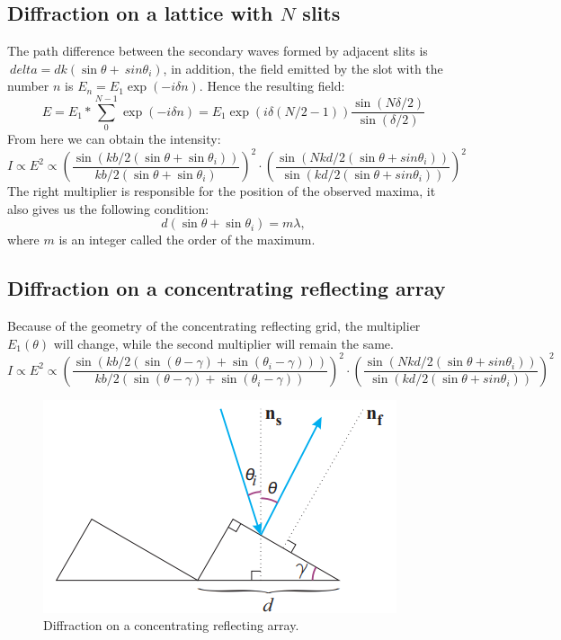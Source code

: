 \documentclass[a4paper, 12pt]{article}
\begin{document}
	\subsection*{Diffraction on a lattice with $N$ slits}
	The path difference between the secondary waves formed by adjacent slits is $ \ delta = d k (\sin{\theta} + \ sin{\theta_i})$, in addition, the field emitted by the slot with the number $n$ is $ E_n = E_1 \exp(-i \delta n)$. Hence the resulting field:
	\begin{equation}
		E = E_1 * \sum_{0}^{N-1} \exp(-i \delta n) = E_1 \exp(i\delta(N/2 - 1)) \frac{\sin(N \delta /2)}{\sin(\delta /2)}
	\end{equation}
	From here we can obtain the intensity:
	\begin{equation}
		I \propto E^2 \propto (\frac{\sin(k b / 2 (\sin{\theta} + \sin{\theta_i}))}{k b / 2 (\sin{\theta} + \sin{\theta_i})})^2 \cdot (\frac{\sin(N k d / 2 (\sin{\theta} + sin{\theta_i}))}{\sin(k d / 2 (\sin{\theta} + sin{\theta_i}))})^2
	\end{equation}
	The right multiplier is responsible for the position of the observed maxima, it also gives us the following condition:
	\begin{equation}
		d(\sin{\theta} + \sin{\theta_i}) = m \lambda,
	\end{equation}
	where $m$ is an integer called the order of the maximum.
	\subsection*{Diffraction on a concentrating reflecting array}
	Because of the geometry of the concentrating reflecting grid, the multiplier $E_1(\theta)$ will change, while the second multiplier will remain the same.
	\begin{equation}
		I \propto E^2 \propto (\frac{\sin(k b / 2 (\sin(\theta - \gamma) + \sin(\theta_i - \gamma)))}{k b / 2 (\sin(\theta - \gamma) + \sin(\theta_i - \gamma))})^2 \cdot  (\frac{\sin(N k d / 2 (\sin{\theta} + sin{\theta_i}))}{\sin(k d / 2 (\sin{\theta} + sin{\theta_i}))})^2
	\end{equation}
	
	\begin{figure}[H]
		\centering
		\includegraphics[width=0.85\linewidth]{diff2.png}
		\caption{Diffraction on a concentrating reflecting array.}
		\label{fig:2}
	\end{figure}
	
\end{document}
